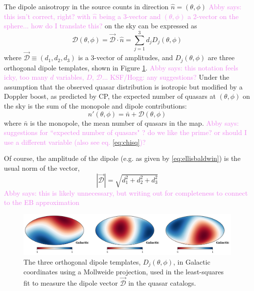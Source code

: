 \documentclass[modern]{aastex631}
\newcommand{\abby}[1]{\textcolor{violet}{Abby says: #1}}
\begin{document}
The dipole anisotropy in the source counts in direction $\hat n=(\theta,\phi)$ \abby{this isn't correct, right? with $\hat n$ being a 3-vector and $(\theta,\phi)$ a 2-vector on the sphere... how do I translate this?} on the sky can be expressed as
\begin{equation}
    \mathcal{D}(\theta,\phi)=\vec{\mathcal{D}}\cdot \hat n = \sum_{j=1}^3 d_jD_j(\theta,\phi)
\end{equation}
where $\vec{\mathcal{D}}\equiv(d_1,d_2,d_3)$ is a 3-vector of amplitudes, and $D_j(\theta,\phi)$ are three orthogonal dipole templates, shown in Figure \ref{fig:dipole_templates}.
\abby{this notation feels icky, too many $d$ variables, $D$, $\mathcal{D}$... KSF/Hogg: any suggestions?}
Under the assumption that the observed quasar distribution is isotropic but modified by a Doppler boost, as predicted by CP, the expected number of quasars at $(\theta,\phi)$ on the sky is the sum of the monopole and dipole contributions:
\begin{equation}
\label{eq:dipole_model}
    n'(\theta,\phi) = \bar n + \mathcal{D}(\theta,\phi)
\end{equation}
where $\bar n$ is the monopole, the mean number of quasars in the map.
\abby{suggestions for ``expected number of quasars" ? do we like the prime? or should I use a different variable (also see eq. \ref{eq:chisq})?}

Of course, the amplitude of the dipole (e.g. as given by \ref{eq:ellisbaldwin}) is the usual norm of the vector,
\begin{equation}
    |\vec{\mathcal{D}}|=\sqrt{d_1^2 + d_2^2 + d_3^2}
\end{equation}
\abby{this is likely unnecessary, but writing out for completeness to connect to the EB approximation}

\begin{figure}
    \centering
    \includegraphics[width=\textwidth]{images/dipole_templates.png}
    \caption{The three orthogonal dipole templates, $D_j(\theta,\phi)$, in Galactic coordinates using a Mollweide projection, used in the least-squares fit to measure the dipole vector $\vec{\mathcal{D}}$ in the quasar catalogs.}
    \label{fig:dipole_templates}
\end{figure}
\end{document}
